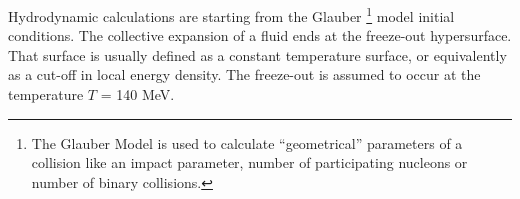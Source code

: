     Hydrodynamic calculations are starting from the Glauber \footnote{The Glauber Model is used to calculate ``geometrical'' parameters of a collision like an impact parameter, number of participating nucleons or number of binary collisions.}
    model initial conditions.
    The collective expansion of a fluid ends at the freeze-out hypersurface.
    That surface is usually defined as a constant temperature surface, or equivalently as a cut-off in local energy density.
    The freeze-out is assumed to occur at the temperature $T$ = 140 MeV.
